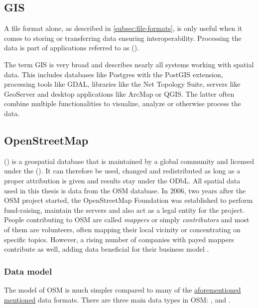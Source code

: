 	\subsection{GIS}
	
		A file format alone, as described in \cref{subsec:file-formats}, is only useful when it comes to storing or transferring data ensuring interoperability.
		Processing the data is part of applications referred to as  ().
		
		The term GIS is very broad and describes nearly all systems working with spatial data.
		This includes databases like Postgres with the PostGIS extension, processing tools like GDAL, libraries like the Net Topology Suite, servers like GeoServer and desktop applications like ArcMap or QGIS.
		The latter often combine multiple functionalities to visualize, analyze or otherwise process the data.
	
	\subsection{OpenStreetMap}
	\label{subsec:osm}
	
		 () is a geospatial database that is maintained by a global community and licensed under the  ()\cite{osm-wiki-about}.
		It can therefore be used, changed and redistributed as long as a proper attribution is given and results stay under the ODbL\cite{odbl-summary}.
		All spatial data used in this thesis is data from the OSM database.
		In 2006, two years after the OSM project started, the OpenStreetMap Foundation was established to perform fund-raising, maintain the servers and also act as a legal entity for the project.
		People contributing to OSM are called \textit{mappers} or simply \textit{contributors} and most of them are volunteers, often mapping their local vicinity or concentrating on specific topics.
		However, a rising number of companies with payed mappers contribute as well, adding data beneficial for their business model \cite{osm-corporate-mappers}.
		
		\subsubsection{Data model}
		
			The model of OSM is much simpler compared to many of the \hyperref[subsec:file-formats]{aforementioned mentioned} data formats.
			There are three main data types in OSM: ,  and \cite{osm-wiki-data-model}.
			
